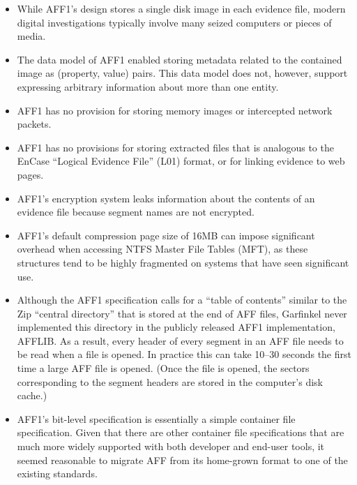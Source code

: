 \documentclass[10pt, conference]{IEEEtran}
\begin{document}
\begin{itemize}
\item While AFF1's design stores a single disk image in each evidence
  file, modern digital investigations typically involve many seized
  computers or pieces of media. 

\item The data model of AFF1 enabled storing metadata related to the 
  contained image as (property, value) pairs. This data model does
  not, however, support expressing arbitrary information about more
  than one entity.

\item AFF1 has no provision for storing memory images or intercepted
  network packets.

\item AFF1 has no provisions for storing extracted files that is
  analogous to the EnCase ``Logical Evidence File'' (L01) format, or
  for linking evidence to web pages.

\item AFF1's encryption system leaks information about the contents of
  an evidence file because segment names are not encrypted.

\item AFF1's default compression page size of 16MB can impose significant overhead
  when accessing NTFS Master File Tables (MFT), as these structures
  tend to be highly fragmented on systems that have seen significant
  use.

\item Although the AFF1 specification calls for a ``table of contents'' similar
  to the Zip\cite{zip-format} ``central directory'' that is stored at
  the end of AFF files, Garfinkel never implemented this directory in
  the publicly released AFF1 implementation, AFFLIB. As a result,
  every header of every segment in an AFF file needs to be read when a
  file is opened. In practice this can take 10--30 seconds the first
  time a large AFF file is opened. (Once the file is opened, the
  sectors corresponding to the segment headers are stored in the
  computer's disk cache.)

\item AFF1's bit-level specification is essentially a simple container
  file specification. Given that there are other container file
  specifications that are much more widely supported with both
  developer and end-user tools, it seemed reasonable to migrate AFF
  from its home-grown format to one of the existing standards.

\end{itemize}
\end{document}

